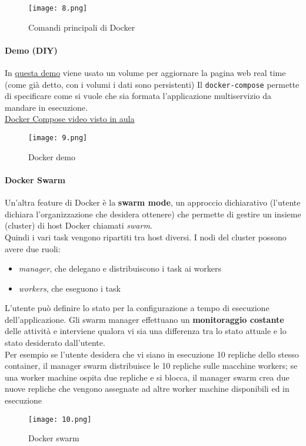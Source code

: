 \begin{figure}[h!]
    \centering
    \texttt{[image: 8.png]}
    \caption{Comandi principali di Docker}
    \label{fig:enter-label}
\end{figure}

\paragraph{Demo (DIY)} In \href{https://www.youtube.com/watch?v=YFl2mCHdv24}{questa demo} viene usato un volume per aggiornare la pagina web real time (come già detto, con i volumi i dati sono persistenti)
Il \verb|docker-compose| permette di specificare come si vuole che sia formata l’applicazione multiservizio da mandare in esecuzione.\\
\href{https://www.youtube.com/watch?v=Qw9zlE3t8Ko}{Docker Compose video visto in aula}

\begin{figure}[h!]
    \centering
    \texttt{[image: 9.png]}
    \caption{Docker demo}
\end{figure}

\paragraph{Docker Swarm} Un’altra feature di Docker è la \textbf{swarm mode}, un approccio dichiarativo (l'utente dichiara l'organizzazione che desidera ottenere) che permette di gestire un insieme (cluster) di host Docker chiamati \textit{swarm}.\\
Quindi i vari task vengono ripartiti tra host diversi. I nodi del cluster possono avere due ruoli:
\begin{itemize}
    \item \textit{manager}, che delegano e distribuiscono i task ai workers
    \item \textit{workers}, che eseguono i task
\end{itemize}
L’utente può definire lo stato per la configurazione a tempo di esecuzione dell’applicazione. Gli swarm manager effettuano un \textbf{monitoraggio costante} delle attività e interviene qualora vi sia una differenza tra lo stato attuale e lo stato desiderato dall’utente.\\
Per esempio se l’utente desidera che vi siano in esecuzione 10 repliche dello stesso container, il manager swarm distribuisce le 10 repliche sulle macchine workers; se una worker machine ospita due repliche e si blocca, il manager swarm crea due nuove repliche che vengono assegnate ad altre worker machine disponibili ed in esecuzione
\begin{figure}[h!]
    \centering
    \texttt{[image: 10.png]}
    \caption{Docker swarm}
\end{figure}

